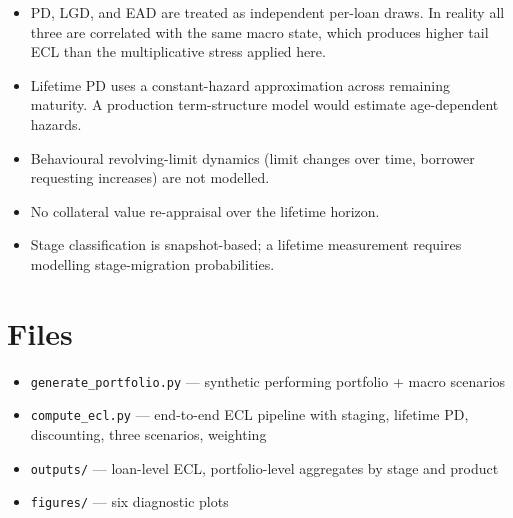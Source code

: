 \documentclass[a4paper,11pt]{article}
\begin{document}
\begin{itemize}
  \item PD, LGD, and EAD are treated as independent per-loan draws.
        In reality all three are correlated with the same macro
        state, which produces higher tail ECL than the multiplicative
        stress applied here.
  \item Lifetime PD uses a constant-hazard approximation across
        remaining maturity. A production term-structure model would
        estimate age-dependent hazards.
  \item Behavioural revolving-limit dynamics (limit changes over
        time, borrower requesting increases) are not modelled.
  \item No collateral value re-appraisal over the lifetime horizon.
  \item Stage classification is snapshot-based; a lifetime measurement
        requires modelling stage-migration probabilities.
\end{itemize}

\section{Files}

\begin{itemize}
  \item \texttt{generate\_portfolio.py} --- synthetic performing
        portfolio + macro scenarios
  \item \texttt{compute\_ecl.py} --- end-to-end ECL pipeline with
        staging, lifetime PD, discounting, three scenarios, weighting
  \item \texttt{outputs/} --- loan-level ECL, portfolio-level
        aggregates by stage and product
  \item \texttt{figures/} --- six diagnostic plots
\end{itemize}
\end{document}
